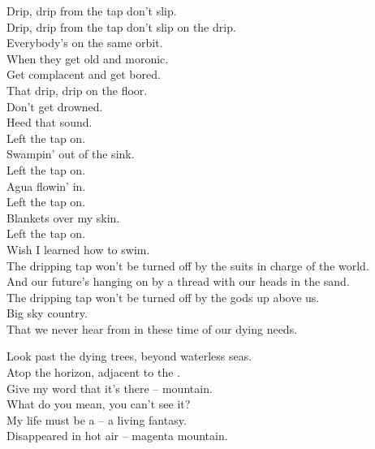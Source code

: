 Drip, drip from the tap don't slip. \\
Drip, drip from the tap don't slip on the drip. \\

Everybody's on the same orbit. \\
When they get old and moronic. \\
Get complacent and get bored. \\
That drip, drip on the floor. \\

Don't get drowned. \\
Heed that sound. \\

Left the tap on. \\
Swampin' out of the sink. \\
Left the tap on. \\
Agua flowin' in. \\
Left the tap on. \\
Blankets over my skin. \\
Left the tap on. \\
Wish I learned how to swim. \\

The dripping tap won't be turned off by the suits in charge of the world. \\
And our future's hanging on by a thread with our heads in the sand. \\
The dripping tap won't be turned off by the gods up above us. \\
Big sky country. \\
That we never hear from in these time of our dying needs. \\




Look past the dying trees, beyond waterless seas. \\
Atop the horizon, adjacent to the . \\
Give my word that it's there --  mountain. \\

What do you mean, you can't see it? \\
My life must be a  -- a living fantasy. \\
Disappeared in hot air -- magenta mountain. \\

